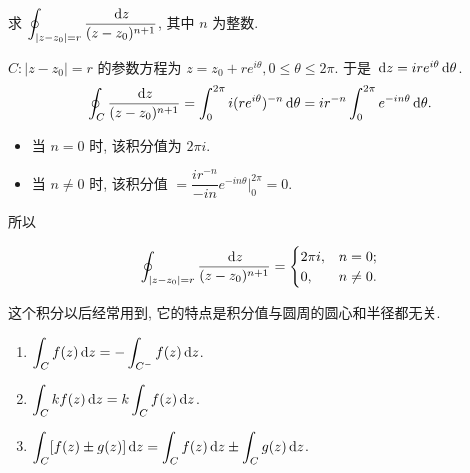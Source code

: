 \begin{example}
	求 $\displaystyle\oint_{|z-z_0|=r}\frac{\,\mathrm{d} z}{(z-z_0)^{n+1}}$, 其中 $n$ 为整数.
\end{example}
\begin{center}
\end{center}
\begin{solution}
	$C: |z-z_0|=r$ 的参数方程为 $z=z_0+re^{i\theta},0\le \theta\le 2\pi$.
	于是 $\,\mathrm{d} z=ire^{i\theta}\,\mathrm{d} \theta$.
	\[
		\oint_C\frac{\,\mathrm{d} z}{(z-z_0)^{n+1}}
		=\int_0^{2\pi}i(re^{i\theta})^{-n}\,\mathrm{d}\theta
		=ir^{-n}\int_0^{2\pi}e^{-in\theta}\,\mathrm{d}\theta.
	\]
	\begin{itemize}
		\item 当 $n=0$ 时, 该积分值为 $2\pi i$.
		\item 当 $n\neq 0$ 时, 该积分值 $=\dfrac{ir^{-n}}{-in}e^{-in\theta}\big|_0^{2\pi}=0$.
	\end{itemize}
\end{solution}
所以
\begin{theorem}[幂函数沿圆周的积分]
	\[\oint_{|z-z_0|=r}\frac{\,\mathrm{d} z}{(z-z_0)^{n+1}}=\begin{cases}2\pi i,&n=0;\\0,&n\neq 0.\end{cases}\]
\end{theorem}

这个积分以后经常用到, 它的特点是积分值与圆周的圆心和半径都无关.

\begin{theorem}[积分的线性性质]
	\begin{enumerate}
		\item $\displaystyle\int_Cf(z)\,\mathrm{d} z=-\displaystyle\int_{C^-}f(z)\,\mathrm{d} z$.
		\item $\displaystyle\int_Ckf(z)\,\mathrm{d} z=k\displaystyle\int_Cf(z)\,\mathrm{d} z$.
		\item $\displaystyle\int_C[f(z)\pm g(z)]\,\mathrm{d} z
		=\displaystyle\int_Cf(z)\,\mathrm{d} z\pm\displaystyle\int_Cg(z)\,\mathrm{d} z$.
	\end{enumerate}
\end{theorem}

